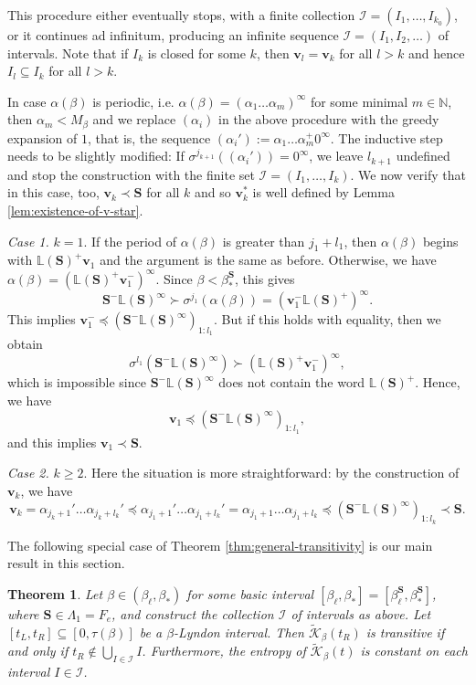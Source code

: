 \documentclass[11pt]{amsart}
\newtheorem{theorem}{Theorem}[section]
\theoremstyle{definition}
\theoremstyle{remark}
\numberwithin{equation}{section}
\newcommand{\N}{\ensuremath{\mathbb{N}}}
\renewcommand{\L}{\ensuremath{\mathbb{L}}}
\newcommand{\II}{\mathcal{I}}
\newcommand{\Kt}{\widetilde{\mathcal{K}}}
\newcommand{\cs}{ {\mathbf{S}}}
\renewcommand{\v}{\mathbf{v}}
\newcommand{\f}{\infty}
\newcommand{\al}{\alpha}
\newcommand{\lle}{\preccurlyeq}
\newcommand{\si}{\sigma}
\newcommand{\La}{\Lambda}
\begin{document}
This procedure either eventually stops, with a finite collection $\II=(I_1,\dots,I_{k_0})$, or it continues ad infinitum, producing an infinite sequence $\II=(I_1,I_2,\dots)$ of intervals. Note that if $I_k$ is closed for some $k$, then $\v_l=\v_k$ for all $l>k$ and hence $I_l\subseteq I_k$ for all $l>k$.


In case $\alpha(\beta)$ is periodic, i.e. $\alpha(\beta)=(\al_1\dots\al_m)^\f$ for some {minimal $m\in\N$, then $\al_m{<M_\beta}$ and} we replace $(\al_i)$ in the above procedure with the greedy expansion of $1$, that is, the sequence $(\al_i'):=\al_1\dots{\al_m^+}0^\f$. The inductive step needs to be slightly modified: If $\si^{j_{k+1}}((\al_i'))=0^\f$, we leave $l_{k+1}$ undefined and stop the construction with the finite set $\II=(I_1,\dots,I_k)$. We now verify that in this case, too, $\v_k\prec\cs$ for all $k$ and so $\v_k^*$ is well defined by Lemma \ref{lem:existence-of-v-star}. 

{\em Case 1.} $k=1$. If the period of $\al(\beta)$ is greater than $j_1+l_1$, then $\al(\beta)$ begins with $\L(\cs)^+\v_1$ and the argument is the same as before. Otherwise, we have $\al(\beta)=(\L(\cs)^+\v_1^-)^\f$. Since $\beta<\beta_*^\cs$, this gives
\[
\cs^-\L(\cs)^\f\succ \si^{j_1}(\al(\beta))=(\v_1^-\L(\cs)^+)^\f.
\]
This implies $\v_1^-\lle (\cs^-\L(\cs)^\f)_{1:l_1}$. But if this holds with equality, then we obtain
\[
\si^{l_1}(\cs^-\L(\cs)^\f)\succ (\L(\cs)^+\v_1^-)^\f,
\]
which is impossible since $\cs^-\L(\cs)^\f$ does not contain the word $\L(\cs)^+$. Hence, we have
\begin{equation} \label{eq:v1-small}
\v_1\lle (\cs^-\L(\cs)^\f)_{1:l_1},
\end{equation}
and this implies $\v_1\prec\cs$.

{\em Case 2.} $k\geq 2$. Here the situation is more straightforward: by the construction of $\v_k$, we have
\begin{equation} \label{eq:v_k-small}
\v_k=\al_{j_k+1}'\dots\al_{j_k+l_k}'\lle \al_{j_1+1}'\dots\al_{j_1+l_k}'=\al_{j_1+1}\dots\al_{j_1+l_k}\lle (\cs^-\L(\cs)^\f)_{1:l_k}\prec \cs.
\end{equation}

The following special case of Theorem \ref{thm:general-transitivity} is our main result in this section.

\begin{theorem} \label{thm:basic-interval-transitivity}
Let $\beta\in(\beta_\ell,\beta_*)$ for some basic interval $[\beta_\ell,\beta_*]=[\beta_\ell^\cs,\beta_*^\cs]$, where $\cs\in\La_1={F_e}$, and construct the collection $\II$ of intervals as above. Let $[t_L,t_R]\subseteq [0,\tau(\beta)]$ be a $\beta$-Lyndon interval. Then $\Kt_\beta(t_R)$ is transitive if and only if $t_R\not\in \bigcup_{I\in\II}I$. Furthermore, the entropy of $\Kt_\beta(t)$ is constant on each interval $I\in\II$.
\end{theorem}
\end{document}
